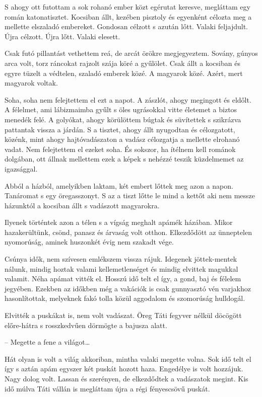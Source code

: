 \documentclass{IEEEtran}
\begin{document}
S ahogy ott futottam a sok rohanó ember közt egérutat keresve, megláttam egy román katonatisztet. Kocsiban állt, kezében pisztoly és egyenként célozta meg a mellette elszaladó embereket. Gondosan célzott s azután lőtt. Valaki feljajdult. Újra célzott. Újra lőtt. Valaki elesett.

Csak futó pillantást vethettem reá, de arcát örökre megjegyeztem. Sovány, gúnyos arca volt, torz ráncokat rajzolt szája köré a gyűlölet. Csak állt a kocsiban és egyre tüzelt a védtelen, szaladó emberek közé. A magyarok közé. Azért, mert magyarok voltak.

Soha, soha nem felejtettem el ezt a napot. A zászlót, ahogy megingott és eldőlt. A félelmet, ami lábizmaimba gyűlt s öles ugrásokkal vitte életemet a biztos menedék felé. A golyókat, ahogy körülöttem búgtak és süvítettek s szikrázva pattantak vissza a járdán. S a tisztet, ahogy állt nyugodtan és célozgatott, közénk, mint ahogy hajtóvadászaton a vadász célozgatja a mellette elrohanó vadat. Nem felejtettem el ezeket soha. És sokszor, ha ítélnem kell románok dolgában, ott állnak mellettem ezek a képek s nehézzé teszik küzdelmemet az igazsággal.

Abból a házból, amelyikben laktam, két embert lőttek meg azon a napon. Tanáromat s egy öregasszonyt. S az a tiszt lőtte le mind a kettőt aki nem messze házunktól a kocsiban állt s vadászott magyarokra.

Ilyenek történtek azon a télen s a vígság meghalt apámék házában. Mikor hazakerültünk, csönd, panasz és árvaság volt otthon. Elkezdődött az ünneptelen nyomorúság, aminek huszonkét évig nem szakadt vége.

Csúnya idők, nem szívesen emlékszem vissza rájuk. Idegenek jöttek-mentek nálunk, mindig hoztak valami kellemetlenséget és mindig elvittek magukkal valamit. Néha apámat vitték el. Hosszú idő telt el így, a gond, baj és félelem jegyében. Ezekben az időkben még a vakációk is csak gunnyasztó vén varjakhoz hasonlítottak, melyeknek fakó tolla közül aggodalom és szomorúság hulldogál.

Elvitték a puskákat is, nem volt vadászat. Öreg Táti fegyver nélkül döcögött előre-hátra s rosszkedvűen dörmögte a bajusza alatt.

– Megette a fene a világot…

Hát olyan is volt a világ akkoriban, mintha valaki megette volna. Sok idő telt el így s aztán apám egyszer két puskát hozott haza. Engedélye is volt hozzájuk. Nagy dolog volt. Lassan és szerényen, de elkezdődtek a vadászatok megint. Kis idő múlva Táti vállán is megláttam újra a régi fényescsövű puskát.
\end{document}
